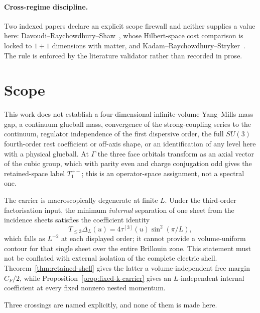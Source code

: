 \documentclass[11pt]{article}
\theoremstyle{plain}
\theoremstyle{definition}
\theoremstyle{remark}
\newcommand{\chk}[1]{}
\newcommand{\CF}{C_F}
\begin{document}
\paragraph{Cross-regime discipline.} Two indexed papers declare an explicit
scope firewall and neither supplies a value here:
Davoudi--Raychowdhury--Shaw~\cite{DRS2021}, whose Hilbert-space cost comparison
is locked to $1{+}1$ dimensions with matter, and
Kadam--Raychowdhury--Stryker~\cite{KRS2023}. The rule is enforced by the
literature validator rather than recorded in prose.
\chk{a cross-regime paper never supplies a value}

\section{Scope}
\label{sec:scope}

This work does not establish a four-dimensional infinite-volume Yang--Mills
mass gap, a continuum glueball mass, convergence of the strong-coupling series
to the continuum, regulator independence of the first dispersive order, the
full $SU(3)$ fourth-order rest coefficient or off-axis shape, or an
identification of any level here with a physical glueball. At $\Gamma$ the
three face orbitals transform as an axial vector of the cubic group, which
with parity even and charge conjugation odd gives the retained-space label
$T_1^{+-}$; this is an operator-space assignment, not a spectral one.

The carrier is macroscopically degenerate at finite $L$. Under the
third-order factorisation input, the minimum \emph{internal} separation of one
sheet from the incidence sheets satisfies the coefficient identity
\[
 T_{\le3}\Delta_L(u)
 =4\tau^{[3]}(u)\sin^2(\pi/L),
\]
which falls as $L^{-2}$ at each displayed order; it cannot
provide a volume-uniform contour for that single sheet over the entire
Brillouin zone. This statement must not be conflated with external isolation
of the complete electric shell. Theorem~\ref{thm:retained-shell} gives the
latter a volume-independent free margin $\CF/2$, while
Proposition~\ref{prop:fixed-k-carrier} gives an $L$-independent internal
coefficient at every fixed nonzero nested momentum.
\chk{Delta\_L = 4 tau(u) sin\^{}2(pi/L) is positive and falls as L\^{}-2}

Three crossings are named explicitly, and none of them is made here.
\end{document}
